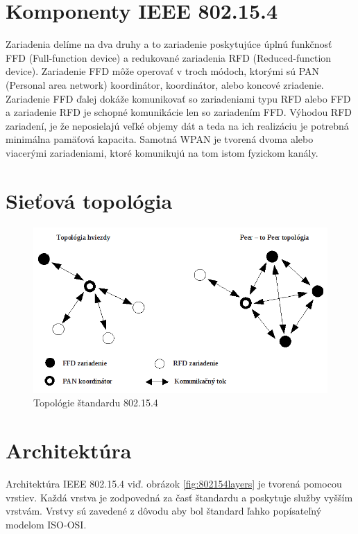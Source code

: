 \documentclass[11pt,twoside,a4paper]{book}
\begin{document}
	
\section{Komponenty IEEE 802.15.4}
Zariadenia delíme na dva druhy a to zariadenie poskytujúce úplnú funkčnosť FFD (Full-function device) a redukované zariadenia RFD (Reduced-function device). Zariadenie FFD môže operovať v troch módoch, ktorými sú PAN (Personal area network) koordinátor, koordinátor, alebo koncové zriadenie. Zariadenie FFD ďalej dokáže komunikovať so zariadeniami typu RFD alebo FFD a zariadenie RFD je schopné komunikácie len so zariadením FFD. Výhodou RFD zariadení, je že neposielajú veľké objemy dát a teda na ich realizáciu je potrebná minimálna pamäťová kapacita. 
Samotná WPAN je tvorená dvoma alebo viacerými zariadeniami, ktoré komunikujú na tom istom fyzickom kanály.

\newpage 

\section{Sieťová topológia}

\begin{figure}[h]
 \centering
 \includegraphics[width=12cm]{./figures/topologies802154.png}
 \caption{Topológie štandardu 802.15.4}
 \label{fig:80215topologies}
\end{figure}


\section{Architektúra}
Architektúra IEEE 802.15.4 viď. obrázok \ref{fig:802154layers} je tvorená pomocou vrstiev. Každá vrstva je zodpovedná za časť štandardu a poskytuje služby vyšším vrstvám. Vrstvy sú zavedené z dôvodu aby bol štandard ľahko popísateľný modelom ISO-OSI. 
\end{document}
